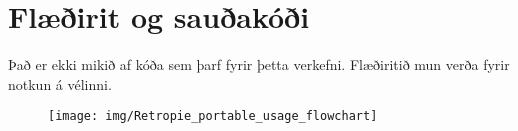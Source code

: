 \section{Flæðirit og sauðakóði}Það er ekki mikið af kóða sem þarf fyrir þetta verkefni. Flæðiritið mun verða fyrir notkun á vélinni.
\begin{figure}[h]
\texttt{[image: img/Retropie\_portable\_usage\_flowchart]}
\end{figure}
